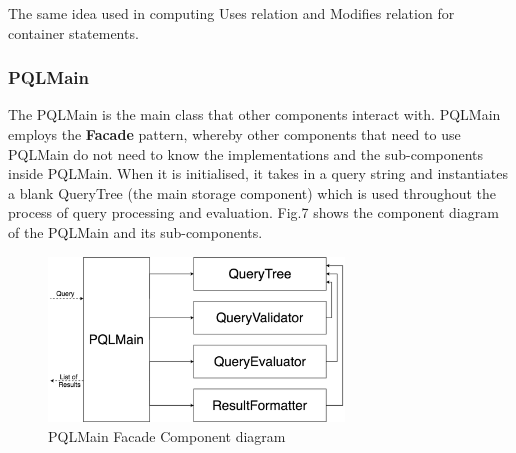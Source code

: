 \documentclass[12pt]{article}
\begin{document}
{{{{{{{{{{The same idea used in computing Uses relation and Modifies relation for container statements.

\subsubsection{PQLMain}
The PQLMain is the main class that other components interact with. PQLMain employs the \textbf{Facade} pattern, whereby other components that need to use PQLMain do not need to know the implementations and the sub-components inside PQLMain. When it is initialised, it takes in a query string and instantiates a blank QueryTree (the main storage component) which is used throughout the process of  query processing and evaluation. Fig.7 shows the component diagram of the PQLMain and its sub-components. \newline
\begin{figure}[htbp]
  \caption{PQLMain Facade Component diagram}
  \centering 
 \includegraphics[width=0.7\textwidth]{PQL_Main.png}
\end{figure}
}}}}}}}}}}
\end{document}
